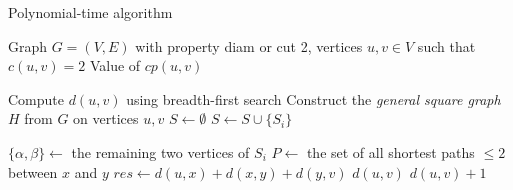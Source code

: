 \documentclass [xcolor=svgnames, t] {beamer}
\begin{document}
\begin{frame}{Polynomial-time algorithm}
\vspace{-1em}
    \begin{algorithm}[H]
    \tiny
\caption{Polynomial-time algorithm for computing \(cp(u,v)\) in a graph with the \textbf{diam or cut 2} property and \(c(u,v) = 2\)}
\begin{algorithmic}[1]
\Require Graph \(G=(V,E)\) with property diam or cut 2, vertices \(u,v \in V\) such that \(c(u,v)=2\)
\Ensure Value of \(cp(u,v)\)

\State Compute \(d(u,v)\) using breadth-first search
\State Construct the \textit{general square graph} \(H\) from \(G\) on vertices \(u,v\)
\State \(S \gets \emptyset\)
    \State \(S \gets S \cup \{S_i\}\)
\EndFor

        \State \(\{\alpha, \beta\} \gets\) the remaining two vertices of \(S_i\)
        \State \(P \gets\) the set of all shortest paths \(\leq2\) between \(x\) and \(y\)
                \State \(res \gets d(u,x) + d(x,y) + d(y,v)\)
                    \State \Return \(d(u,v)\)
                \EndIf
            \EndIf
        \EndFor
    \EndFor
\EndFor
\State \Return \(d(u,v) + 1\)
\end{algorithmic}
\end{algorithm}
\end{frame}
\end{document}
